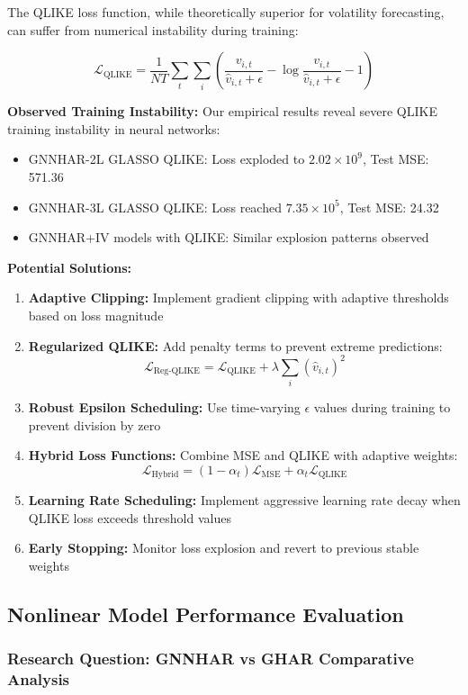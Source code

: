 \documentclass[12pt,a4paper]{article}
\begin{document}
The QLIKE loss function, while theoretically superior for volatility forecasting, can suffer from numerical instability during training:

$$\mathcal{L}_{\text{QLIKE}} = \frac{1}{NT}\sum_{t}\sum_{i}\left(\frac{v_{i,t}}{\hat{v}_{i,t}+\epsilon} - \log\frac{v_{i,t}}{\hat{v}_{i,t}+\epsilon} - 1\right)$$

\textbf{Observed Training Instability:} Our empirical results reveal severe QLIKE training instability in neural networks:
\begin{itemize}
\item GNNHAR-2L GLASSO QLIKE: Loss exploded to $2.02 \times 10^9$, Test MSE: 571.36
\item GNNHAR-3L GLASSO QLIKE: Loss reached $7.35 \times 10^5$, Test MSE: 24.32
\item GNNHAR+IV models with QLIKE: Similar explosion patterns observed
\end{itemize}

\textbf{Potential Solutions:}
\begin{enumerate}
\item \textbf{Adaptive Clipping:} Implement gradient clipping with adaptive thresholds based on loss magnitude
\item \textbf{Regularized QLIKE:} Add penalty terms to prevent extreme predictions:
$$\mathcal{L}_{\text{Reg-QLIKE}} = \mathcal{L}_{\text{QLIKE}} + \lambda \sum_i (\hat{v}_{i,t})^2$$
\item \textbf{Robust Epsilon Scheduling:} Use time-varying $\epsilon$ values during training to prevent division by zero
\item \textbf{Hybrid Loss Functions:} Combine MSE and QLIKE with adaptive weights:
$$\mathcal{L}_{\text{Hybrid}} = (1-\alpha_t) \mathcal{L}_{\text{MSE}} + \alpha_t \mathcal{L}_{\text{QLIKE}}$$
\item \textbf{Learning Rate Scheduling:} Implement aggressive learning rate decay when QLIKE loss exceeds threshold values
\item \textbf{Early Stopping:} Monitor loss explosion and revert to previous stable weights
\end{enumerate}

\subsection{Nonlinear Model Performance Evaluation}

\subsubsection{Research Question: GNNHAR vs GHAR Comparative Analysis}
\end{document}

